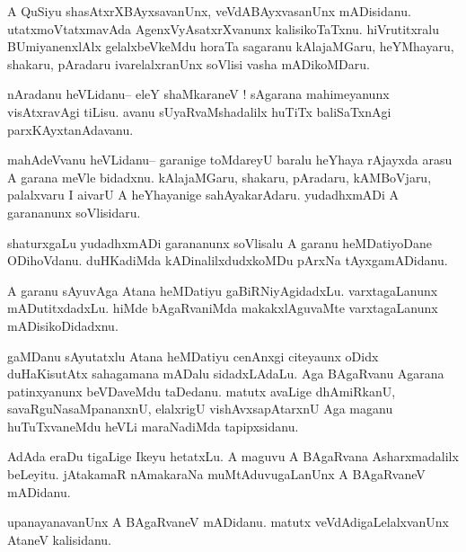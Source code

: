 \documentclass{article}
\begin{document}
\begin{mn}%
A QuSiyu shasAtxrXBAyxsavanUnx, veVdABAyxvasanUnx mADisidanu. utatxmoVtatxmavAda 
AgenxVyAsatxrXvanunx kalisikoTaTxnu. hiVrutitxralu BUmiyanenxlAlx gelalxbeVkeMdu horaTa 
sagaranu kAlajaMGaru, heYMhayaru, shakaru, pAradaru ivarelalxranUnx soVlisi vasha mADikoMDaru.
\end{mn}

\begin{mn}%
nAradanu heVLidanu-- eleY shaMkaraneV ! sAgarana mahimeyanunx visAtxravAgi tiLisu. avanu 
sUyaRvaMshadalilx huTiTx baliSaTxnAgi parxKAyxtanAdavanu.
\end{mn}

\begin{mn}%
mahAdeVvanu heVLidanu-- garanige toMdareyU baralu heYhaya rAjayxda arasu A garana meVle 
bidadxnu. kAlajaMGaru, shakaru, pAradaru, kAMBoVjaru, palalxvaru I aivarU A heYhayanige 
sahAyakarAdaru. yudadhxmADi A garananunx soVlisidaru.
\end{mn}

\begin{mn}%
shaturxgaLu yudadhxmADi garananunx soVlisalu A garanu heMDatiyoDane ODihoVdanu. duHKadiMda 
kADinalilxdudxkoMDu pArxNa tAyxgamADidanu.
\end{mn}

\begin{mn}%
A garanu sAyuvAga Atana heMDatiyu gaBiRNiyAgidadxLu. varxtagaLanunx mADutitxdadxLu. hiMde 
bAgaRvaniMda makakxlAguvaMte varxtagaLanunx mADisikoDidadxnu.
\end{mn}

\begin{mn}%
gaMDanu sAyutatxlu Atana heMDatiyu cenAnxgi citeyaunx oDidx duHaKisutAtx sahagamana mADalu 
sidadxLAdaLu. Aga BAgaRvanu Agarana patinxyanunx beVDaveMdu taDedanu. matutx avaLige 
dhAmiRkanU, savaRguNasaMpananxnU, elalxrigU vishAvxsapAtarxnU Aga maganu huTuTxvaneMdu 
heVLi maraNadiMda tapipxsidanu.
\end{mn}

\begin{mn}%
AdAda eraDu tigaLige Ikeyu hetatxLu. A maguvu A BAgaRvana Asharxmadalilx beLeyitu. jAtakamaR 
nAmakaraNa muMtAduvugaLanUnx A BAgaRvaneV mADidanu.
\end{mn}

\begin{mn}%
upanayanavanUnx A BAgaRvaneV mADidanu. matutx veVdAdigaLelalxvanUnx AtaneV kalisidanu.
\end{mn}
\end{document}
